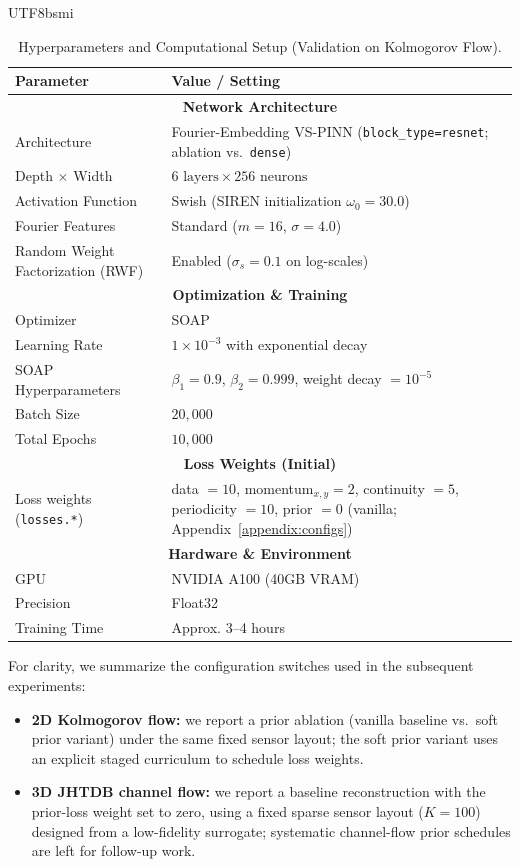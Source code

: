 \documentclass[master]{NTHUthesis}
\begin{document}
\begin{CJK*}{UTF8}{bsmi}
\begin{table}[htbp]
    \centering
    \caption{Hyperparameters and Computational Setup (Validation on Kolmogorov Flow).}
    \label{tab:hyperparameters}
    \begin{tabular}{ll}
    \toprule
    \textbf{Parameter} & \textbf{Value / Setting} \\
    \midrule
    \multicolumn{2}{c}{\textbf{Network Architecture}} \\
    Architecture & Fourier-Embedding VS-PINN (\texttt{block\_type=resnet}; ablation vs.\ \texttt{dense}) \\
    Depth $\times$ Width & $6 \text{ layers} \times 256 \text{ neurons}$ \\
    Activation Function & Swish (SIREN initialization $\omega_0=30.0$) \\
    Fourier Features & Standard ($m=16$, $\sigma=4.0$) \\
    Random Weight Factorization (RWF) & Enabled ($\sigma_s=0.1$ on log-scales) \\
    \midrule
    \multicolumn{2}{c}{\textbf{Optimization \& Training}} \\
    Optimizer & SOAP \\
    Learning Rate & $1 \times 10^{-3}$ with exponential decay \\
    SOAP Hyperparameters & $\beta_1=0.9$, $\beta_2=0.999$, weight decay $=10^{-5}$ \\
    Batch Size & $20,000$ \\
    Total Epochs & $10,000$ \\
    \midrule
    \multicolumn{2}{c}{\textbf{Loss Weights (Initial)}} \\
    Loss weights (\texttt{losses.*}) & data $=10$, momentum$_{x,y}=2$, continuity $=5$, periodicity $=10$, prior $=0$ (vanilla; Appendix~\ref{appendix:configs}) \\
    \midrule
    \multicolumn{2}{c}{\textbf{Hardware \& Environment}} \\
    GPU & NVIDIA A100 (40GB VRAM) \\
    Precision & Float32 \\
    Training Time & Approx. 3--4 hours \\
    \bottomrule
    \end{tabular}
\end{table}

For clarity, we summarize the configuration switches used in the subsequent experiments:
\begin{itemize}
    \item \textbf{2D Kolmogorov flow:} we report a prior ablation (vanilla baseline vs.\ soft prior variant) under the same fixed sensor layout; the soft prior variant uses an explicit staged curriculum to schedule loss weights.
    \item \textbf{3D JHTDB channel flow:} we report a baseline reconstruction with the prior-loss weight set to zero, using a fixed sparse sensor layout ($K=100$) designed from a low-fidelity surrogate; systematic channel-flow prior schedules are left for follow-up work.
\end{itemize}



\end{CJK*}
\end{document}
